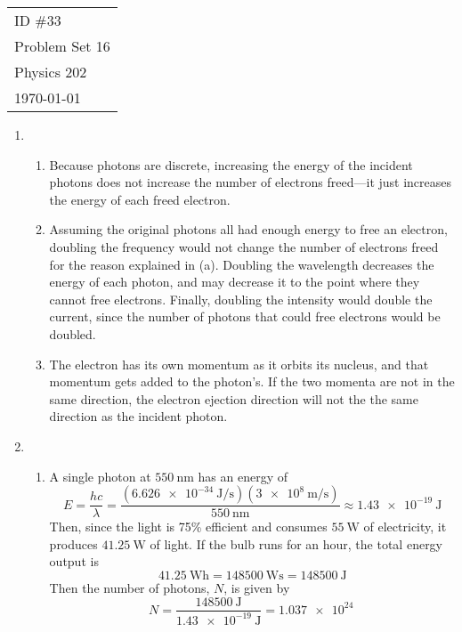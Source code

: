 \documentclass[fleqn]{article}[12pt]
\begin{document}
    \begin{tabular}{l}
        ID \#33 \\
        Problem Set 16 \\
        Physics 202 \\
        \today
    \end{tabular}

\begin{enumerate}
    \item \begin{enumerate}
        \item Because photons are discrete, increasing the energy of the incident photons does not increase the number of electrons freed---it just increases the energy of each freed electron.

        \item Assuming the original photons all had enough energy to free an electron, doubling the frequency would not change the number of electrons freed for the reason explained in (a). Doubling the wavelength decreases the energy of each photon, and may decrease it to the point where they cannot free electrons. Finally, doubling the intensity would double the current, since the number of photons that could free electrons would be doubled.

        \item The electron has its own momentum as it orbits its nucleus, and that momentum gets added to the photon's. If the two momenta are not in the same direction, the electron ejection direction will not the the same direction as the incident photon.
    \end{enumerate}

    \item \begin{enumerate}
        \item A single photon at $\SI{550}{\nano\m}$ has an energy of
        \begin{equation*}
            E = \frac{hc}{\lambda} = \frac{(\SI{6.626e-34}{\joule/\s})(\SI{3e8}{\m/\s})}{\SI{550}{\nano\meter}} \approx \SI{1.43e-19}{\joule}
        \end{equation*}
        Then, since the light is 75\% efficient and consumes $\SI{55}{\watt}$ of electricity, it produces $\SI{41.25}{\watt}$ of light. If the bulb runs for an hour, the total energy output is
        \begin{equation*}
            \SI{41.25}{\watt\hour} = \SI{148500}{\watt\second} = \SI{148500}{\joule}
        \end{equation*}
        Then the number of photons, $N$, is given by
        \begin{equation*}
            N = \frac{\SI{148500}{\joule}}{\SI{1.43e-19}{\joule}} = \SI{1.037e24}{}
        \end{equation*}


\end{enumerate}
\end{enumerate}
\end{document}
